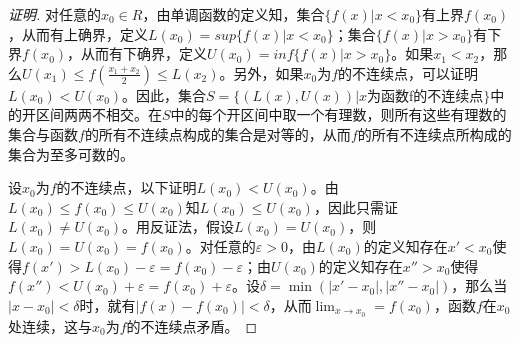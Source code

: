 \begin{proof}[证明]
  对任意的$x_0\in R$，由单调函数的定义知，集合$\{f(x)|x<x_0\}$有上界$f(x_0)$，从而有上确界，定义$L(x_0)=sup \{f(x)|x<x_0\}$；集合$\{f(x)|x>x_0\}$有下界$f(x_0)$，从而有下确界，定义$U(x_0)=inf \{f(x)|x>x_0\}$。如果$x_1<x_2$，那么$U(x_1)\leq f(\frac{x_1+x_2}{2}) \leq L(x_2)$。另外，如果$x_0$为$f$的不连续点，可以证明$L(x_0) <  U(x_0)$。因此，集合$S=\{(L(x),U(x))|x\text{为函数}$f$\text{的不连续点}\}$中的开区间两两不相交。在$S$中的每个开区间中取一个有理数，则所有这些有理数的集合与函数$f$的所有不连续点构成的集合是对等的，从而$f$的所有不连续点所构成的集合为至多可数的。

  设$x_0$为$f$的不连续点，以下证明$L(x_0) <  U(x_0)$。由$L(x_0)\leq f(x_0) \leq U(x_0)$知$L(x_0) \leq U(x_0)$，因此只需证$L(x_0)\neq U(x_0)$。用反证法，假设$L(x_0)=U(x_0)$，则$L(x_0)=U(x_0)=f(x_0)$。对任意的$\varepsilon >0$，由$L(x_0)$的定义知存在$x'<x_0$使得$f(x')>L(x_0)-\varepsilon=f(x_0)-\varepsilon$；由$U(x_0)$的定义知存在$x''>x_0$使得$f(x'')<U(x_0) + \varepsilon=f(x_0) + \varepsilon$。设$\delta = \min (|x'-x_0|, |x''-x_0|)$，那么当$|x-x_0|< \delta$时，就有$|f(x)-f(x_0)|<\delta$，从而$\lim_{x\to x_0}=f(x_0)$，函数$f$在$x_0$处连续，这与$x_0$为$f$的不连续点矛盾。
\end{proof}
